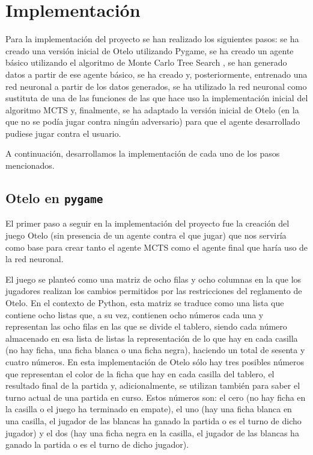 \documentclass[conference]{IEEEtran}
\begin{document}
\section{Implementación}
Para la implementación del proyecto se han realizado los siguientes pasos: se ha creado una versión inicial de Otelo utilizando Pygame, se ha creado un agente básico utilizando el algoritmo de Monte Carlo Tree Search \cite{browne2012}, se han generado datos a partir de ese agente básico, se ha creado y, posteriormente, entrenado una red neuronal a partir de los datos generados, se ha utilizado la red neuronal como sustituta de una de las funciones de las que hace uso la implementación inicial del algoritmo MCTS y, finalmente, se ha adaptado la versión inicial de Otelo (en la que no se podía jugar contra ningún adversario) para que el agente desarrollado pudiese jugar contra el usuario.

A continuación, desarrollamos la implementación de cada uno de los pasos mencionados.

\subsection{Otelo en \texttt{pygame}}
El primer paso a seguir en la implementación del proyecto fue la creación del juego Otelo (sin presencia de un agente contra el que jugar) que nos serviría como base para crear tanto el agente MCTS como el agente final que haría uso de la red neuronal.

El juego se planteó como una matriz de ocho filas y ocho columnas en la que los jugadores realizan los cambios permitidos por las restricciones del reglamento de Otelo. En el contexto de Python, esta matriz se traduce como una lista que contiene ocho listas que, a su vez, contienen ocho números cada una y representan las ocho filas en las que se divide el tablero, siendo cada número almacenado en esa lista de listas la representación de lo que hay en cada casilla (no hay ficha, una ficha blanca o una ficha negra), haciendo un total de sesenta y cuatro números. En esta implementación de Otelo sólo hay tres posibles números que representan el color de la ficha que hay en cada casilla del tablero, el resultado final de la partida y, adicionalmente, se utilizan también para saber el turno actual de una partida en curso. Estos números son: el cero (no hay ficha en la casilla o el juego ha terminado en empate), el uno (hay una ficha blanca en una casilla, el jugador de las blancas ha ganado la partida o es el turno de dicho jugador) y el dos (hay una ficha negra en la casilla, el jugador de las blancas ha ganado la partida o es el turno de dicho jugador).
\end{document}
